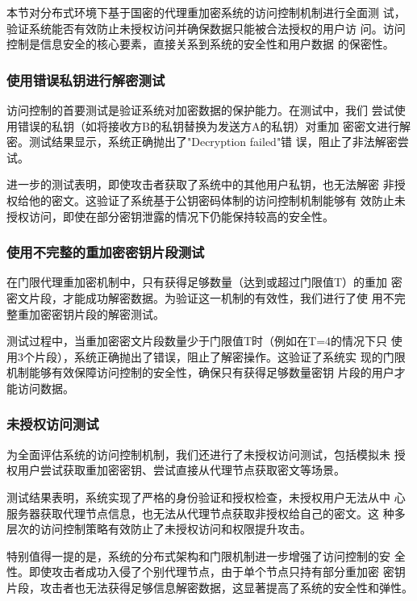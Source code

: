 本节对分布式环境下基于国密的代理重加密系统的访问控制机制进行全面测
试，验证系统能否有效防止未授权访问并确保数据只能被合法授权的用户访
问。访问控制是信息安全的核心要素，直接关系到系统的安全性和用户数据
的保密性。

\subsubsection{使用错误私钥进行解密测试}

访问控制的首要测试是验证系统对加密数据的保护能力。在测试中，我们
尝试使用错误的私钥（如将接收方B的私钥替换为发送方A的私钥）对重加
密密文进行解密。测试结果显示，系统正确抛出了"Decryption failed"错
误，阻止了非法解密尝试。

进一步的测试表明，即使攻击者获取了系统中的其他用户私钥，也无法解密
非授权给他的密文。这验证了系统基于公钥密码体制的访问控制机制能够有
效防止未授权访问，即使在部分密钥泄露的情况下仍能保持较高的安全性。

\subsubsection{使用不完整的重加密密钥片段测试}

在门限代理重加密机制中，只有获得足够数量（达到或超过门限值T）的重加
密密文片段，才能成功解密数据。为验证这一机制的有效性，我们进行了使
用不完整重加密密钥片段的解密测试。

测试过程中，当重加密密文片段数量少于门限值T时（例如在T=4的情况下只
使用3个片段），系统正确抛出了错误，阻止了解密操作。这验证了系统实
现的门限机制能够有效保障访问控制的安全性，确保只有获得足够数量密钥
片段的用户才能访问数据。

\subsubsection{未授权访问测试}

为全面评估系统的访问控制机制，我们还进行了未授权访问测试，包括模拟未
授权用户尝试获取重加密密钥、尝试直接从代理节点获取密文等场景。

测试结果表明，系统实现了严格的身份验证和授权检查，未授权用户无法从中
心服务器获取代理节点信息，也无法从代理节点获取非授权给自己的密文。这
种多层次的访问控制策略有效防止了未授权访问和权限提升攻击。

特别值得一提的是，系统的分布式架构和门限机制进一步增强了访问控制的安
全性。即使攻击者成功入侵了个别代理节点，由于单个节点只持有部分重加密
密钥片段，攻击者也无法获得足够信息解密数据，这显著提高了系统的安全性和弹性。

